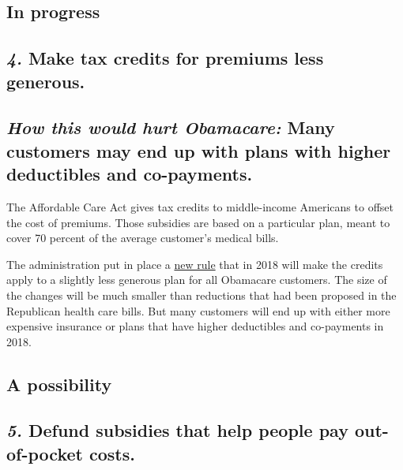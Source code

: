 \hypertarget{in-progress-3}{%
\subsection{In progress}\label{in-progress-3}}

\hypertarget{4-make-tax-credits-for-premiums-less-generous}{%
\subsection{\texorpdfstring{\emph{\textbf{4.}} \textbf{Make tax credits
for premiums less
generous.}}{4. Make tax credits for premiums less generous.}}\label{4-make-tax-credits-for-premiums-less-generous}}

\hypertarget{how-this-would-hurt-obamacare-many-customers-may-end-up-with-plans-with-higher-deductibles-and-co-payments}{%
\subsection{\texorpdfstring{\emph{How this would hurt Obamacare:} Many
customers may end up with plans with higher deductibles and
co-payments.}{How this would hurt Obamacare: Many customers may end up with plans with higher deductibles and co-payments.}}\label{how-this-would-hurt-obamacare-many-customers-may-end-up-with-plans-with-higher-deductibles-and-co-payments}}

The Affordable Care Act gives tax credits to middle-income Americans to
offset the cost of premiums. Those subsidies are based on a particular
plan, meant to cover 70 percent of the average customer's medical bills.

The administration put in place a
\href{https://www.cms.gov/Newsroom/MediaReleaseDatabase/Press-releases/2017-Press-releases-items/2017-04-13-2.html}{new
rule} that in 2018 will make the credits apply to a slightly less
generous plan for all Obamacare customers. The size of the changes will
be much smaller than reductions that had been proposed in the Republican
health care bills. But many customers will end up with either more
expensive insurance or plans that have higher deductibles and
co-payments in 2018.

\hypertarget{a-possibility}{%
\subsection{A possibility}\label{a-possibility}}

\hypertarget{5-defund-subsidies-that-help-people-pay-out-of-pocket-costs}{%
\subsection{\texorpdfstring{\emph{\textbf{5.}} \textbf{Defund subsidies
that help people pay out-of-pocket
costs.}}{5. Defund subsidies that help people pay out-of-pocket costs.}}\label{5-defund-subsidies-that-help-people-pay-out-of-pocket-costs}}

